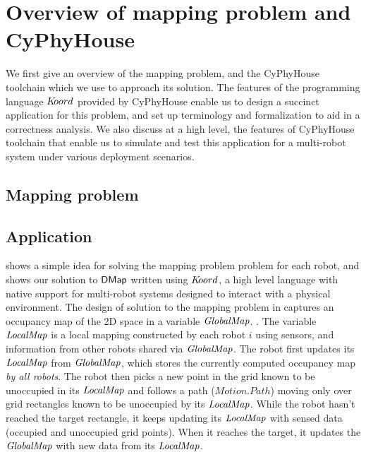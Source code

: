 \section{Overview of mapping problem and CyPhyHouse}
\label{sec:semantics}

We first give an overview of the mapping problem, and the CyPhyHouse toolchain which we use to approach its solution. The features of the programming language $K\kern-2pt oord$ provided by CyPhyHouse enable us to design a succinct application for this problem, and set up terminology and formalization to aid in a correctness analysis. We also discuss at a high level, the features of CyPhyHouse toolchain that enable us to simulate and test this application for a multi-robot system under various deployment scenarios.

\subsection{Mapping problem }

\subsection{\dmap Application}

 shows a simple idea for solving the mapping problem problem for each robot, and  shows our solution to ${\sf DMap}$ written using $K\kern-2pt oord$, a high level language with native support for multi-robot systems designed to interact with a physical environment. The design of solution to the mapping problem in  captures an occupancy map of the 2D space in a variable $\mathit{GlobalMap}$. . The variable $\mathit{LocalMap}$ is a local mapping constructed by each robot $i$ using sensors, and information from other robots shared via $\mathit{GlobalMap}$. The robot first updates its $\mathit{LocalMap}$ from $\mathit{GlobalMap}$, which stores the currently computed occupancy map \emph{by all robots}.  The robot then picks a new point in the grid known to be unoccupied in its $\mathit{LocalMap}$ and follows a path ($\mathit{Motion.Path}$) moving only over grid rectangles known to be unoccupied by its $\mathit{LocalMap}$. While the robot hasn't reached the target rectangle, it keeps updating its $\mathit{LocalMap}$ with sensed data (occupied and unoccupied grid points). When it reaches the target, it updates the $\mathit{GlobalMap}$ with new data from its $\mathit{LocalMap}$.

